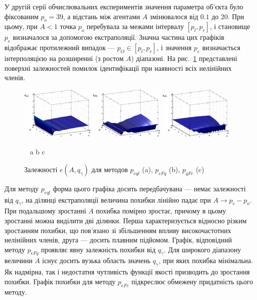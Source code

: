 \documentclass[a4paper,13pt]{atuaref}
\begin{document}
У другій серії обчислювальних експериментів значення параметра об'єкта було
фіксованим $p_o = 39$, а відстань між агентами $A$ змінювалося від $0.1$
до $20$. При цьому, при $A <1$ точка $p_o$ перебувала за межами інтервалу
$[p_l, p_r]$, і становище $p_e$ визначалося за допомогою екстраполяції.
Значна частина цих графіків відображає протилежний випадок --- $p_O \in [p_l,p_r]$,
і значення $p_e$ визначається інтерполяцією на розширенні (з ростом $A$) діапазоні.
На рис.~\ref{atu:f:qsl_pe_A_qg_all} представлені поверхні залежностей помилок ідентифікації
при наявності всіх нелінійних членів.

\begin{figure}[htb!]
  \centerline{
    \includegraphics[width=0.32\textwidth]{p3/p/qls_pe-p_A_qg_eql_all_xl.png}
    \hfill
    \includegraphics[width=0.32\textwidth]{p3/p/qls_pe-p_A_qg_eFq_all_xl.png}
    \hfill
    \includegraphics[width=0.32\textwidth]{p3/p/qls_pe-p_A_qg_eFc_all_xl.png}
  }
  \vspace{-1.5ex}
  \begin{center}
    ~ \hfill a \hfill\hfill b \hfill\hfill c \hfill ~
  \end{center}
  \vspace{-2.5ex}
  \caption{Залежності $e(A,q_\gamma)$ для методов $p_{eql}$ (a), $p_{eFq}$ (b), $p_{qFc}$ (c)}
  \label{atu:f:qsl_pe_A_qg_all}
\end{figure}

Для методу $p_{eql}$ форма цього графіка досить передбачувана --- немає
залежності від $q_\gamma$, на ділянці екстраполяції величина похибки
лінійно падає при $A \to p_c - p_o$. При подальшому зростанні $A$ похибка
помірно зростає, причому в цьому зростанні можна виділити дві ділянки. Перша
характеризується відносно різким зростанням похибки, що пов'язано зі збільшенням
впливу високочастотних нелінійних членів, друга --- досить плавним підйомом.
Графік, відповідний методу $p_{eFq}$ проявляє явну залежність похибки від
$q_\gamma$. Для широкого діапазону величини $ A $ існує досить вузька область
значень $q_\gamma$, при яких похибка мінімальна. Як надмірна, так і
недостатня чутливість функції якості призводить до зростання похибки.
Графік похибки для методу $p_{eFc}$ підкреслює обмежену придатність цього методу.
\end{document}
